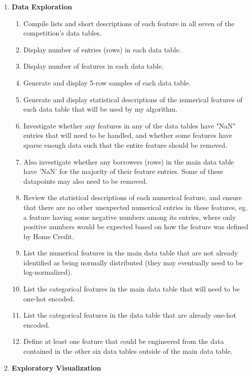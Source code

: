 \documentclass[12pt, letterpaper]{article}
\begin{document}
\renewcommand{\labelenumi}{\Roman{enumi}}
\begin{enumerate}
  \item \textbf{Data Exploration}
    \begin{enumerate}
      \item Compile lists and short descriptions of each feature in all seven of the competition's data tables.
      \item Display number of entries (rows) in each data table.
      \item Display number of features in each data table.
      \item Generate and display 5-row samples of each data table.
      \item Generate and display statistical descriptions of the numerical features of each data table that will be used by my algorithm.
      \item Investigate whether any features in any of the data tables have "NaN" entries that will need to be handled, and whether some features have sparse enough data such that the entire feature should be removed.
      \item Also investigate whether any borrowers (rows) in the main data table have 'NaN' for the majority of their feature entries. Some of these datapoints may also need to be removed.
      \item Review the statistical descriptions of each numerical feature, and ensure that there are no other unexpected numerical entries in these features, eg. a feature having some negative numbers among its entries, where only positive numbers would be expected based on how the feature was defined by Home Credit.
      \item List the numerical features in the main data table that are not already identified as being normally distributed (they may eventually need to be log-normalized).
      \item List the categorical features in the main data table that will need to be one-hot encoded.
      \item List the categorical features in the data table that are already one-hot encoded.
      \item Define at least one feature that could be engineered from the data contained in the other six data tables outside of the main data table.
    \end{enumerate}
  \item \textbf{Exploratory Visualization}
    \begin{enumerate}

\end{enumerate}
\end{enumerate}
\end{document}
